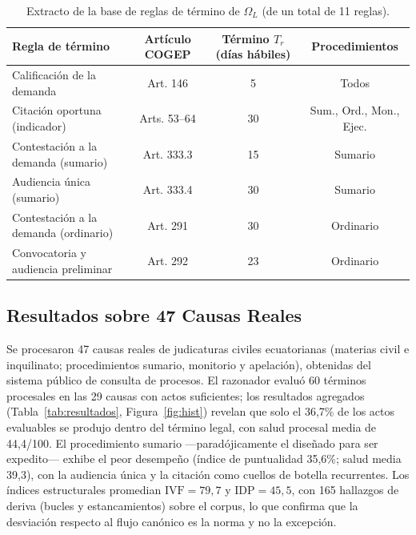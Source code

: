 \documentclass[computers,article,submit,pdftex,moreauthors]{Definitions/mdpi}
\begin{document}
\begin{table}[H]
\caption{Extracto de la base de reglas de término de $\Omega_L$ (de un total de 11 reglas).}
\label{tab:kb}
\begin{tabularx}{\textwidth}{Xccc}
\toprule
\textbf{Regla de término} & \textbf{Artículo COGEP} & \textbf{Término $T_r$ (días hábiles)} & \textbf{Procedimientos}\\
\midrule
Calificación de la demanda & Art. 146 & 5 & Todos\\
Citación oportuna (indicador) & Arts. 53--64 & 30 & Sum., Ord., Mon., Ejec.\\
Contestación a la demanda (sumario) & Art. 333.3 & 15 & Sumario\\
Audiencia única (sumario) & Art. 333.4 & 30 & Sumario\\
Contestación a la demanda (ordinario) & Art. 291 & 30 & Ordinario\\
Convocatoria y audiencia preliminar & Art. 292 & 23 & Ordinario\\
\bottomrule
\end{tabularx}
\end{table}

\subsection{Resultados sobre 47 Causas Reales}
Se procesaron 47 causas reales de judicaturas civiles ecuatorianas (materias civil e inquilinato; procedimientos sumario, monitorio y apelación), obtenidas del sistema público de consulta de procesos. El razonador evaluó 60 términos procesales en las 29 causas con actos suficientes; los resultados agregados (Tabla~\ref{tab:resultados}, Figura~\ref{fig:hist}) revelan que solo el 36{,}7\% de los actos evaluables se produjo dentro del término legal, con salud procesal media de 44{,}4/100. El procedimiento sumario ---paradójicamente el diseñado para ser expedito--- exhibe el peor desempeño (índice de puntualidad 35{,}6\%; salud media 39{,}3), con la audiencia única y la citación como cuellos de botella recurrentes. Los índices estructurales promedian $\mathrm{IVF} = 79{,}7$ y $\mathrm{IDP} = 45{,}5$, con 165 hallazgos de deriva (bucles y estancamientos) sobre el corpus, lo que confirma que la desviación respecto al flujo canónico es la norma y no la excepción.
\end{document}
